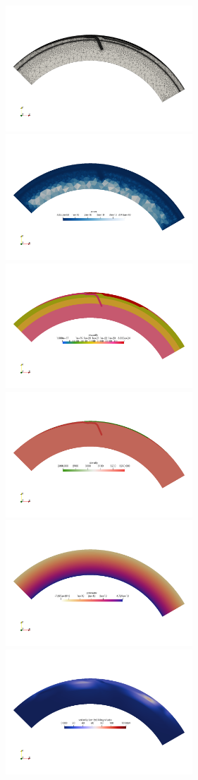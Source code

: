\begin{center}
\includegraphics[width=7cm]{python_codes/fieldstone_44/results/mesh}
\includegraphics[width=7cm]{python_codes/fieldstone_44/results/area}\\
\includegraphics[width=7cm]{python_codes/fieldstone_44/results/eta}
\includegraphics[width=7cm]{python_codes/fieldstone_44/results/rho}\\
\includegraphics[width=7cm]{python_codes/fieldstone_44/results/p}
\includegraphics[width=7cm]{python_codes/fieldstone_44/results/vel}
\end{center}
